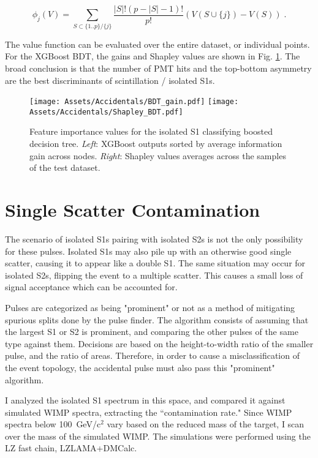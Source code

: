 \begin{equation}
    \phi_j (V) = \sum_{S \subset \{1..p\} / \{j\}} \frac{|S|! (p - |S| - 1)!}{p!} (V(S \cup \{j\}) - V(S))\;.
\end{equation}

The value function can be evaluated over the entire dataset, or individual points.
For the XGBoost BDT, the gains and Shapley values are shown in Fig. \ref{fig:feature_importances}.
The broad conclusion is that the number of PMT hits and the top-bottom asymmetry are the best discriminants of scintillation / isolated S1s.


\begin{figure}
    \centering
    \texttt{[image: Assets/Accidentals/BDT\_gain.pdf]}
        \texttt{[image: Assets/Accidentals/Shapley\_BDT.pdf]}
    \caption[Feature importance values for the isolated S1 classifying boosted decision tree.]%
    {Feature importance values for the isolated S1 classifying boosted decision tree.
    \textit{Left}: XGBoost outputs sorted by average information gain across nodes.
    \textit{Right}: Shapley values averages across the samples of the test dataset.
    }
    \label{fig:feature_importances}
\end{figure}

\afterpage{\FloatBarrier}

\section{Single Scatter Contamination}
The scenario of isolated S1s pairing with isolated S2s is not the only possibility for these pulses.
Isolated S1s may also pile up with an otherwise good single scatter, causing it to appear like a double S1.
The same situation may occur for isolated S2s, flipping the event to a multiple scatter.
This causes a small loss of signal acceptance which can be accounted for.

Pulses are categorized as being "prominent" or not as a method of mitigating spurious splits done by the pulse finder.
The algorithm consists of assuming that the largest S1 or S2 is prominent, and comparing the other pulses of the same type against them.
Decisions are based on the height-to-width ratio of the smaller pulse, and the ratio of areas.
Therefore, in order to cause a misclassification of the event topology, the accidental pulse must also pass this "prominent" algorithm.

I analyzed the isolated S1 spectrum in this space, and compared it against simulated WIMP spectra, extracting the ``contamination rate."
Since WIMP spectra below 100~GeV/c$^2$ vary based on the reduced mass of the target, I scan over the mass of the simulated WIMP.
The simulations were performed using the LZ fast chain, LZLAMA+DMCalc.

